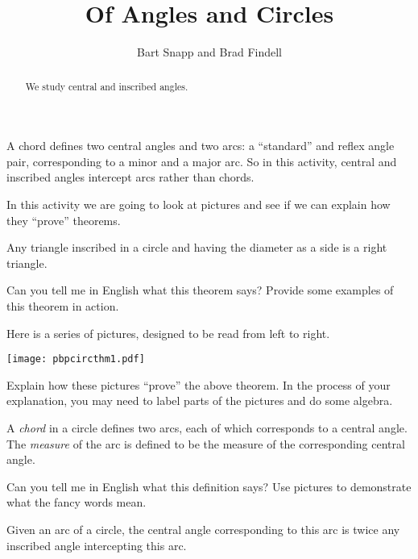 \documentclass[nooutcomes]{ximera}
\title{Of Angles and Circles}
\author{Bart Snapp and Brad Findell}
\begin{document}
\begin{abstract}
We study central and inscribed angles.
\end{abstract}
\maketitle

\begin{teachingnote}
A chord defines two central angles and two arcs: a ``standard'' and reflex angle pair, corresponding to a minor and a major arc.  So in this activity, central and inscribed angles intercept arcs rather than chords.
\end{teachingnote}

In this activity we are going to look at pictures and see if we can
explain how they ``prove'' theorems.

\begin{theorem} 
Any triangle inscribed in a circle and having the diameter as a side is a
right triangle.
\end{theorem}

\begin{problem}
Can you tell me in English what this theorem says? Provide some
examples of this theorem in action.
\end{problem}

\begin{problem} 
Here is a series of pictures, designed to be read from left to right.
\begin{image}
\texttt{[image: pbpcircthm1.pdf]}
\end{image}
Explain how these pictures ``prove'' the above theorem. In the process
of your explanation, you may need to label parts of the pictures and
do some algebra.
\end{problem}

\begin{definition}
A \emph{chord} in a circle defines two {arcs}, each of which corresponds to a {central angle}.  The \emph{measure} of the arc is defined to be the measure of the corresponding central angle.  
\end{definition}

\begin{problem}
Can you tell me in English what this definition says? Use pictures to demonstrate what the fancy words mean.  
\end{problem}

\begin{theorem} 
Given an arc of a circle, the central angle corresponding to this arc is
twice any inscribed angle intercepting this arc.
\end{theorem}
\end{document}
